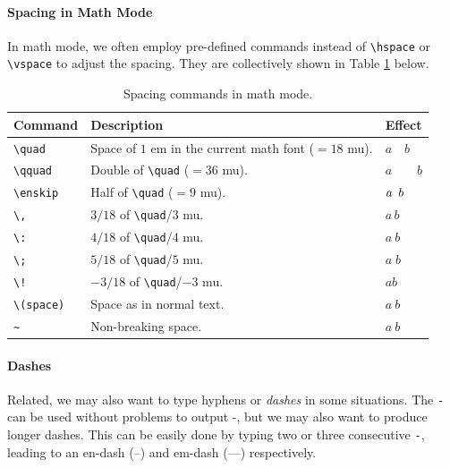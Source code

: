 \paragraph{Spacing in Math Mode}
In math mode, we often employ pre-defined commands instead of \texttt{\textbackslash hspace} or \texttt{\textbackslash vspace} to adjust the spacing. They are collectively shown in Table \ref{tab:mathspace} below.

\begin{table}[ht!]
\begin{tabularx}{\textwidth}{|p{}|>{\raggedright}p{}|X|}
\hline
Command & Description & Effect \\
\hline
\texttt{\textbackslash quad} & Space of $1$ em in the current math font ($= 18$ mu). & $a\quad b$ \\
\hline
\texttt{\textbackslash qquad} & Double of \texttt{\textbackslash quad} ($= 36$ mu). & $a\qquad b$ \\
\hline
\texttt{\textbackslash enskip} & Half of \texttt{\textbackslash quad} ($= 9$ mu). & $a\enskip b$ \\
\hline
\texttt{\textbackslash ,} & $3/18$ of \texttt{\textbackslash quad}/$3$ mu. & $a\,b$ \\
\hline
\texttt{\textbackslash :} & $4/18$ of \texttt{\textbackslash quad}/$4$ mu. & $a\:b$ \\
\hline
\texttt{\textbackslash ;} & $5/18$ of \texttt{\textbackslash quad}/$5$ mu. & $a\;b$ \\
\hline
\texttt{\textbackslash !} & $-3/18$ of \texttt{\textbackslash quad}/$-3$ mu. & $a\!b$ \\
\hline
\texttt{\textbackslash (space)} & Space as in normal text. & $a\ b$ \\
\hline
\texttt{\~} & Non-breaking space. & $a~b$ \\
\hline
\end{tabularx}
\caption{Spacing commands in math mode.}
\label{tab:mathspace}
\end{table}

\paragraph{Dashes}
Related, we may also want to type hyphens or \textit{dashes} in some situations. The \texttt{-} can be used without problems to output -, but we may also want to produce longer dashes. This can be easily done by typing two or three consecutive \texttt{-}, leading to an en-dash (--) and em-dash (---) respectively. 

